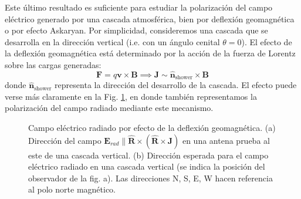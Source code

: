 \documentclass[12 pt, a4paper]{article} %
\numberwithin{equation}{section}
\numberwithin{figure}{section}
\numberwithin{table}{section}
\newcommand{\vect}[1]{\boldsymbol{\mathbf{#1}}}
\begin{document}
Este último resultado es suficiente para estudiar la polarización del campo eléctrico generado por una cascada atmosférica, bien por deflexión geomagnética o por efecto Askaryan. Por simplicidad, consideremos una cascada que se desarrolla en la dirección vertical (i.e. con un ángulo cenital $\theta=0$). El efecto de la deflexión geomagnética está determinado por la acción de la fuerza de Lorentz sobre las cargas generadas:
\begin{equation}
	\vect{F}=q\vect{v}\times \vect{B}\implies \vect{J}\sim \hat{\vect{n}}_{\text{shower}}\times\vect{B}\label{ec38}
\end{equation}
donde $\hat{\vect{n}}_{\text{shower}}$ representa la dirección del desarrollo de la cascada. El efecto puede verse más claramente en la Fig. \ref{Geomag_deflexion}, en donde también representamos la polarización del campo radiado mediante este mecanismo.

\newpage
\begin{figure}[H]
	\centering
	\hspace{10mm}
	\caption{Campo eléctrico radiado por efecto de la deflexión geomagnética. (a) Dirección del campo $\vect{E}_{rad}\parallel  \hat{\vect{R}}\times\left(\hat{\vect{R}}\times\vect{J}\right)$ en una antena prueba al este de una cascada vertical. (b) Dirección esperada para el campo eléctrico radiado en una cascada vertical (se indica la posición del observador de la fig. a). Las direcciones N, S, E, W hacen referencia al polo norte magnético.}
	\label{Geomag_deflexion}
\end{figure}
\end{document}
